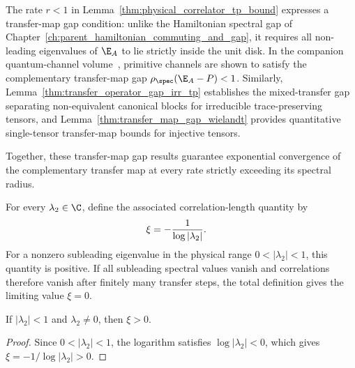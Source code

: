\begin{remark}%
    \label{rem:spectral_hypothesis}
    The rate $r<1$ in Lemma~\ref{thm:physical_correlator_tp_bound}
    expresses a transfer-map gap condition: unlike the Hamiltonian spectral gap of
    Chapter~\ref{ch:parent_hamiltonian_commuting_and_gap}, it requires all
    non-leading eigenvalues of $\E_A$ to lie strictly inside the unit disk.
    In the companion quantum-channel volume~\cite[``Complementary transfer-map gap for primitive maps'']{QICLean2026Blueprint},
    primitive channels are shown to satisfy the complementary transfer-map gap
    $\rho_{\spec}(\E_A-P)<1$.
    Similarly, Lemma~\ref{thm:transfer_operator_gap_irr_tp} establishes the
    mixed-transfer gap separating non-equivalent canonical blocks for irreducible
    trace-preserving tensors, and Lemma~\ref{thm:transfer_map_gap_wielandt}
    provides quantitative single-tensor transfer-map bounds for injective tensors.

    Together, these transfer-map gap results guarantee exponential convergence of the
    complementary transfer map at every rate strictly exceeding its
    spectral radius.
\end{remark}

\begin{definition}\label{def:correlation_length}
    \leanok
    For every $\lambda_2\in\C$, define the associated correlation-length
    quantity by
    \begin{align}
        \xi
         & = -\frac{1}{\log|\lambda_2|}. \notag
    \end{align}
    For a nonzero subleading eigenvalue in the physical range
    $0<|\lambda_2|<1$, this quantity is positive. If all subleading spectral
    values vanish and correlations therefore vanish after finitely many
    transfer steps, the total definition gives the limiting value $\xi=0$.
\end{definition}

\begin{lemma}\label{lem:correlation_length_pos}
    \leanok
    If $|\lambda_2| < 1$ and $\lambda_2 \ne 0$, then $\xi > 0$.
\end{lemma}

\begin{proof}
    \leanok
    Since $0<|\lambda_2|<1$, the logarithm satisfies $\log|\lambda_2|<0$, which
    gives $\xi=-1/\log|\lambda_2|>0$.
\end{proof}

